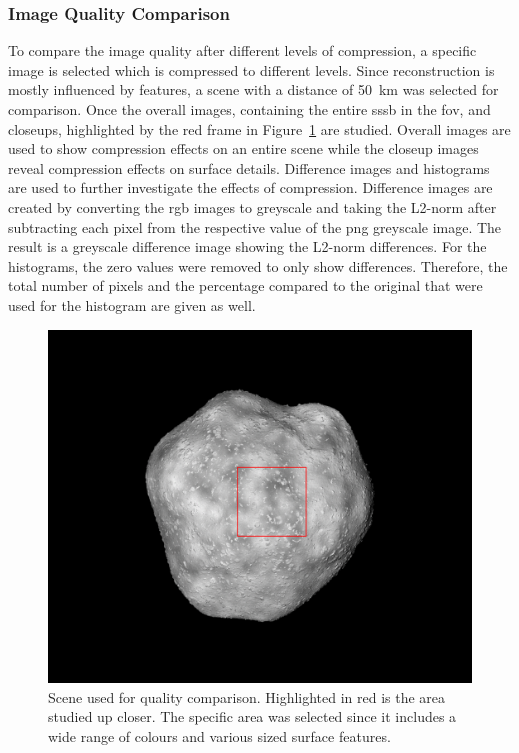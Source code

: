 \subsubsection{Image Quality Comparison} \label{sec:img_quali_comp}
To compare the image quality after different levels of compression, a specific image is selected which is compressed to different levels. Since reconstruction is mostly influenced by features, a scene with a distance of \SI{50}{\kilo\meter} was selected for comparison. Once the overall images, containing the entire \gls{sssb} in the \gls{fov}, and closeups, highlighted by the red frame in Figure~\ref{fig:img_quality_frame} are studied. Overall images are used to show compression effects on an entire scene while the closeup images reveal compression effects on surface details. Difference images and histograms are used to further investigate the effects of compression. Difference images are created by converting the \gls{rgb} images to greyscale and taking the L2-norm after subtracting each pixel from the respective value of the \gls{png} greyscale image. The result is a greyscale difference image showing the L2-norm differences. For the histograms, the zero values were removed to only show differences. Therefore, the total number of pixels and the percentage compared to the original that were used for the histogram are given as well.

\begin{figure}[htb]
    \centering
    \includegraphics[width=.7\textwidth]{doc/thesis/0_figures/compare_quality/set1/jp2_1000_frame.png}
    \caption{Scene used for quality comparison. Highlighted in red is the area studied up closer. The specific area was selected since it includes a wide range of colours and various sized surface features.}
    \label{fig:img_quality_frame}
\end{figure}

